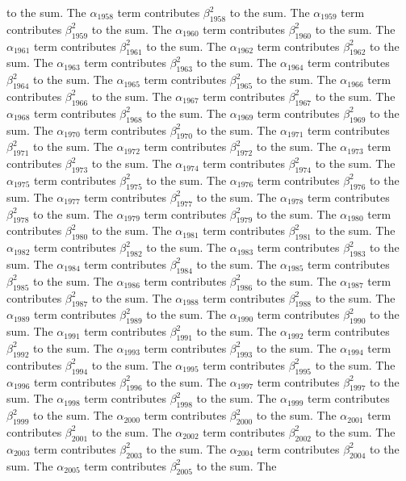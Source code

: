 \begin{lemma}
to the sum. The $\alpha_{1958}$ term contributes $\beta_{1958}^{2}$ to the sum. The $\alpha_{1959}$ term contributes $\beta_{1959}^{2}$ to the sum. The $\alpha_{1960}$ term contributes $\beta_{1960}^{2}$ to the sum. The $\alpha_{1961}$ term contributes $\beta_{1961}^{2}$ to the sum. The $\alpha_{1962}$ term contributes $\beta_{1962}^{2}$ to the sum. The $\alpha_{1963}$ term contributes $\beta_{1963}^{2}$ to the sum. The $\alpha_{1964}$ term contributes $\beta_{1964}^{2}$ to the sum. The $\alpha_{1965}$ term contributes $\beta_{1965}^{2}$ to the sum. The $\alpha_{1966}$ term contributes $\beta_{1966}^{2}$ to the sum. The $\alpha_{1967}$ term contributes $\beta_{1967}^{2}$ to the sum. The $\alpha_{1968}$ term contributes $\beta_{1968}^{2}$ to the sum. The $\alpha_{1969}$ term contributes $\beta_{1969}^{2}$ to the sum. The $\alpha_{1970}$ term contributes $\beta_{1970}^{2}$ to the sum. The $\alpha_{1971}$ term contributes $\beta_{1971}^{2}$ to the sum. The $\alpha_{1972}$ term contributes $\beta_{1972}^{2}$ to the sum. The $\alpha_{1973}$ term contributes $\beta_{1973}^{2}$ to the sum. The $\alpha_{1974}$ term contributes $\beta_{1974}^{2}$ to the sum. The $\alpha_{1975}$ term contributes $\beta_{1975}^{2}$ to the sum. The $\alpha_{1976}$ term contributes $\beta_{1976}^{2}$ to the sum. The $\alpha_{1977}$ term contributes $\beta_{1977}^{2}$ to the sum. The $\alpha_{1978}$ term contributes $\beta_{1978}^{2}$ to the sum. The $\alpha_{1979}$ term contributes $\beta_{1979}^{2}$ to the sum. The $\alpha_{1980}$ term contributes $\beta_{1980}^{2}$ to the sum. The $\alpha_{1981}$ term contributes $\beta_{1981}^{2}$ to the sum. The $\alpha_{1982}$ term contributes $\beta_{1982}^{2}$ to the sum. The $\alpha_{1983}$ term contributes $\beta_{1983}^{2}$ to the sum. The $\alpha_{1984}$ term contributes $\beta_{1984}^{2}$ to the sum. The $\alpha_{1985}$ term contributes $\beta_{1985}^{2}$ to the sum. The $\alpha_{1986}$ term contributes $\beta_{1986}^{2}$ to the sum. The $\alpha_{1987}$ term contributes $\beta_{1987}^{2}$ to the sum. The $\alpha_{1988}$ term contributes $\beta_{1988}^{2}$ to the sum. The $\alpha_{1989}$ term contributes $\beta_{1989}^{2}$ to the sum. The $\alpha_{1990}$ term contributes $\beta_{1990}^{2}$ to the sum. The $\alpha_{1991}$ term contributes $\beta_{1991}^{2}$ to the sum. The $\alpha_{1992}$ term contributes $\beta_{1992}^{2}$ to the sum. The $\alpha_{1993}$ term contributes $\beta_{1993}^{2}$ to the sum. The $\alpha_{1994}$ term contributes $\beta_{1994}^{2}$ to the sum. The $\alpha_{1995}$ term contributes $\beta_{1995}^{2}$ to the sum. The $\alpha_{1996}$ term contributes $\beta_{1996}^{2}$ to the sum. The $\alpha_{1997}$ term contributes $\beta_{1997}^{2}$ to the sum. The $\alpha_{1998}$ term contributes $\beta_{1998}^{2}$ to the sum. The $\alpha_{1999}$ term contributes $\beta_{1999}^{2}$ to the sum. The $\alpha_{2000}$ term contributes $\beta_{2000}^{2}$ to the sum. The $\alpha_{2001}$ term contributes $\beta_{2001}^{2}$ to the sum. The $\alpha_{2002}$ term contributes $\beta_{2002}^{2}$ to the sum. The $\alpha_{2003}$ term contributes $\beta_{2003}^{2}$ to the sum. The $\alpha_{2004}$ term contributes $\beta_{2004}^{2}$ to the sum. The $\alpha_{2005}$ term contributes $\beta_{2005}^{2}$ to the sum. The 
\end{lemma}
